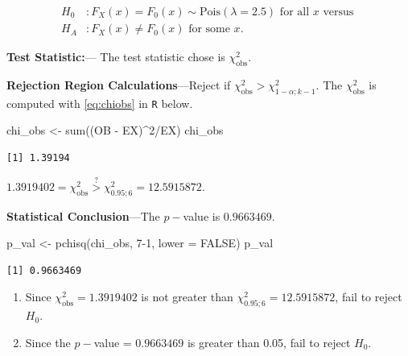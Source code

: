 \documentclass[
]{article}
\newenvironment{Shaded}{\begin{snugshade}}{\end{snugshade}}
\newcommand{\AttributeTok}[1]{\textcolor[rgb]{0.77,0.63,0.00}{#1}}
\newcommand{\ConstantTok}[1]{\textcolor[rgb]{0.00,0.00,0.00}{#1}}
\newcommand{\DecValTok}[1]{\textcolor[rgb]{0.00,0.00,0.81}{#1}}
\newcommand{\FunctionTok}[1]{\textcolor[rgb]{0.00,0.00,0.00}{#1}}
\newcommand{\NormalTok}[1]{#1}
\newcommand{\OtherTok}[1]{\textcolor[rgb]{0.56,0.35,0.01}{#1}}
\newcommand{\SpecialCharTok}[1]{\textcolor[rgb]{0.00,0.00,0.00}{#1}}
\begin{document}
\begin{align*}
        H_0&: F_X(x) = F_0(x) \sim \text{Pois}(\lambda=2.5)\text{ for all } x \text{ versus
        }\\
        H_A&:  F_X(x) \ne F_0(x) \text{ for some } x.
\end{align*}

\textbf{Test Statistic:}--- The test statistic chose is \(\chi_{\text{obs}}^2.\)

\textbf{Rejection Region Calculations}---Reject if \(\chi^2_{\text{obs}}>\chi^2_{1-\alpha;k-1}\). The \(\chi^2_{\text{obs}}\) is computed with \eqref{eq:chiobs} in \texttt{R} below.

\begin{Shaded}
\begin{Highlighting}[]
\NormalTok{chi\_obs }\OtherTok{\textless{}{-}} \FunctionTok{sum}\NormalTok{((OB }\SpecialCharTok{{-}}\NormalTok{ EX)}\SpecialCharTok{\^{}}\DecValTok{2}\SpecialCharTok{/}\NormalTok{EX)}
\NormalTok{chi\_obs}
\end{Highlighting}
\end{Shaded}

\begin{verbatim}
[1] 1.39194
\end{verbatim}

\(1.3919402= \chi^2_{\text{obs}}\overset{?}{>}\chi^2_{0.95;6}=12.5915872\).

\textbf{Statistical Conclusion}---The \(p-\)value is \(0.9663469\).

\begin{Shaded}
\begin{Highlighting}[]
\NormalTok{p\_val }\OtherTok{\textless{}{-}} \FunctionTok{pchisq}\NormalTok{(chi\_obs, }\DecValTok{7{-}1}\NormalTok{, }\AttributeTok{lower =} \ConstantTok{FALSE}\NormalTok{)}
\NormalTok{p\_val}
\end{Highlighting}
\end{Shaded}

\begin{verbatim}
[1] 0.9663469
\end{verbatim}

\begin{enumerate}
\def\labelenumi{\Roman{enumi}.}
\item
  Since \(\chi^2_{\text{obs}}=1.3919402\) is not greater than \(\chi^2_{0.95;6}=12.5915872\), fail to reject \(H_0\).
\item
  Since the \(p-\)value = \(0.9663469\) is greater than 0.05, fail to reject \(H_0\).
\end{enumerate}
\end{document}
